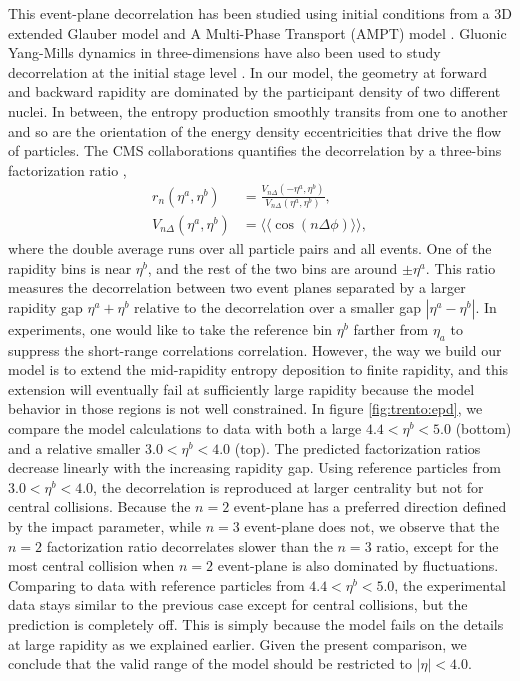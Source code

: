 This event-plane decorrelation has been studied using initial conditions from a 3D extended Glauber model \cite{Bozek:2015bna} and A Multi-Phase Transport (AMPT) model \cite{Jia:2014ysa, Xiao:2012uw,Pang:2015zrq}.
Gluonic Yang-Mills dynamics in three-dimensions have also been used to study decorrelation at the initial stage level \cite{Schenke:2016ksl}.
In our model, the geometry at forward and backward rapidity are dominated by the participant density of two different nuclei.
In between, the entropy production smoothly transits from one to another and so are the orientation of the energy density eccentricities that drive the flow of particles.
The CMS collaborations quantifies the decorrelation by a three-bins factorization ratio \cite{Khachatryan:2015oea},
\begin{eqnarray}
r_n(\eta^a, \eta^b) &= \frac{V_{n\Delta}(-\eta^a, \eta^b)}{V_{n\Delta}(\eta^a, \eta^b)}, \\
V_{n\Delta}(\eta^a, \eta^b) &= \langle\langle \cos(n\Delta\phi) \rangle\rangle,
\end{eqnarray}
where the double average runs over all particle pairs and all events.
One of the rapidity bins is near $\eta^b$, and the rest of the two bins are around $\pm\eta^a$.
This ratio measures the decorrelation between two event planes separated by a larger rapidity gap $\eta^a + \eta^b$ relative to the decorrelation over a smaller gap $|\eta^a - \eta^b|$.
In experiments, one would like to take the reference bin $\eta^b$ farther from $\eta_a$ to suppress the short-range correlations correlation.
However, the way we build our model is to extend the mid-rapidity entropy deposition to finite rapidity, and this extension will eventually fail at sufficiently large rapidity because the model behavior in those regions is not well constrained.
In figure \ref{fig:trento:epd}, we compare the model calculations to data with both a large $4.4<\eta^b<5.0$ (bottom) and a relative smaller $3.0 < \eta^b< 4.0$ (top).
The predicted factorization ratios decrease linearly with the increasing rapidity gap.
Using reference particles from $3.0 < \eta^b< 4.0$, the decorrelation is reproduced at larger centrality but not for central collisions.
Because the $n=2$ event-plane has a preferred direction defined by the impact parameter, while $n=3$ event-plane does not, we observe that the $n=2$ factorization ratio decorrelates slower than the $n=3$ ratio, except for the most central collision when $n=2$ event-plane is also dominated by fluctuations.
Comparing to data with reference particles from $4.4<\eta^b<5.0$, the experimental data stays similar to the previous case except for central collisions, but the prediction is completely off.
This is simply because the model fails on the details at large rapidity as we explained earlier.
Given the present comparison, we conclude that the valid range of the model should be restricted to $|\eta| < 4.0$.

